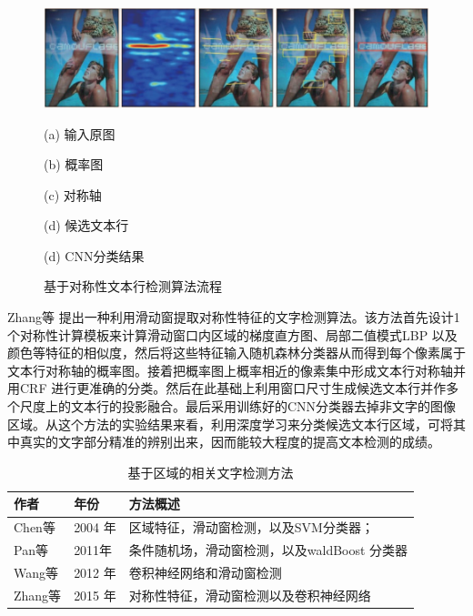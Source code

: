     \begin{figure}[!h]
    \centering
    \includegraphics[width=\textwidth]{./figures/c2_zhang_cnn.jpg}
    \begin{minipage}[t]{0.18\linewidth}
    \centerline{ \small (a) 输入原图}
    \end{minipage}
    \begin{minipage}[t]{0.18\linewidth}
    \centerline{ \small (b) 概率图}
    \end{minipage}
    \begin{minipage}[t]{0.18\linewidth}
    \centerline{ \small (c) 对称轴}
    \end{minipage}
    \begin{minipage}[t]{0.18\linewidth}
    \centerline{ \small (d) 候选文本行}
    \end{minipage}
    \begin{minipage}[t]{0.18\linewidth}
    \centerline{ \small (d) CNN分类结果}
    \end{minipage}
    \caption{基于对称性文本行检测算法流程}
    \label{fig.c2_zhang_cnn}
    \end{figure}

    Zhang等\cite{Zhang2015Symmetry} 提出一种利用滑动窗提取对称性特征的文字检测算法。该方法首先设计1 个对称性计算模板来计算滑动窗口内区域的梯度直方图、局部二值模式LBP 以及颜色等特征的相似度，然后将这些特征输入随机森林分类器从而得到每个像素属于文本行对称轴的概率图。接着把概率图上概率相近的像素集中形成文本行对称轴并用CRF 进行更准确的分类。然后在此基础上利用窗口尺寸生成候选文本行并作多个尺度上的文本行的投影融合。最后采用训练好的CNN分类器去掉非文字的图像区域。从这个方法的实验结果来看，利用深度学习来分类候选文本行区域，可将其中真实的文字部分精准的辨别出来，因而能较大程度的提高文本检测的成绩。

    \begin{table}[!h]
    \centering
    \caption{基于区域的相关文字检测方法}
    \begin{tabular}{p{}|p{}| p{}}
    \hline
    作者 & 年份 & 方法概述 \\
    \hline
    Chen等\cite{Chen2004Detecting} & 2004 年 & 区域特征，滑动窗检测，以及SVM分类器；\\
    Pan等\cite{Pan2011A} & 2011年 &   条件随机场，滑动窗检测，以及waldBoost 分类器\\
    Wang等\cite{Wang2012End} & 2012 年 & 卷积神经网络和滑动窗检测 \\
    Zhang等\cite{Zhang2015Symmetry} & 2015 年 & 对称性特征，滑动窗检测以及卷积神经网络 \\
    \hline
    \end{tabular}
    \label{tab.c2_region_based}
    \end{table}

